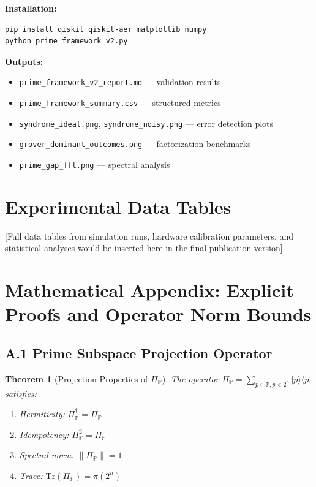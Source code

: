 \documentclass[11pt,letterpaper]{article}
\newtheorem{theorem}{Theorem}
\begin{document}
\textbf{Installation:}
\begin{verbatim}
pip install qiskit qiskit-aer matplotlib numpy
python prime_framework_v2.py
\end{verbatim}

\textbf{Outputs:}
\begin{itemize}
\item \texttt{prime\_framework\_v2\_report.md} — validation results
\item \texttt{prime\_framework\_summary.csv} — structured metrics
\item \texttt{syndrome\_ideal.png}, \texttt{syndrome\_noisy.png} — error detection plots
\item \texttt{grover\_dominant\_outcomes.png} — factorization benchmarks
\item \texttt{prime\_gap\_fft.png} — spectral analysis
\end{itemize}

\section{Experimental Data Tables}

[Full data tables from simulation runs, hardware calibration parameters, and statistical analyses would be inserted here in the final publication version]

\appendix
\section{Mathematical Appendix: Explicit Proofs and Operator Norm Bounds}

\subsection{A.1 Prime Subspace Projection Operator}

\begin{theorem}[Projection Properties of $\Pi_{\mathbb{P}}$]
The operator $\Pi_{\mathbb{P}} = \sum_{p \in \mathbb{P}, p < 2^n} |p\rangle\langle p|$ satisfies:
\begin{enumerate}
\item Hermiticity: $\Pi_{\mathbb{P}}^\dagger = \Pi_{\mathbb{P}}$
\item Idempotency: $\Pi_{\mathbb{P}}^2 = \Pi_{\mathbb{P}}$
\item Spectral norm: $\|\Pi_{\mathbb{P}}\| = 1$
\item Trace: $\text{Tr}(\Pi_{\mathbb{P}}) = \pi(2^n)$
\end{enumerate}
\end{theorem}
\end{document}
